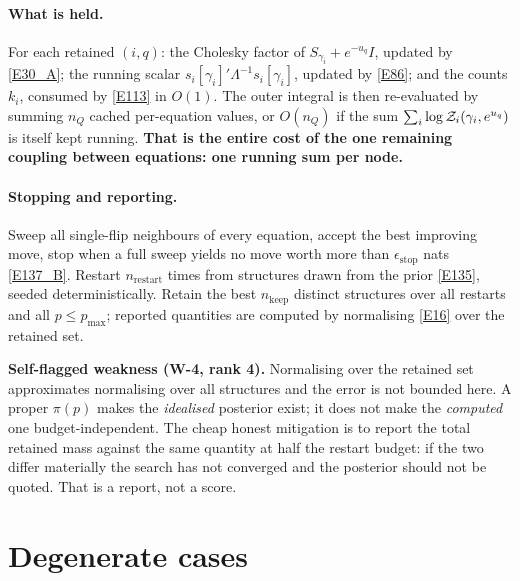 \paragraph{What is held.} For each retained $(i,q)$: the Cholesky factor of
$S_{\gamma_i}+e^{-u_q}I$, updated by \eqref{E30_A}; the running scalar
$s_i[\gamma_i]'\Lambda^{-1}s_i[\gamma_i]$, updated by \eqref{E86}; and the counts
$k_i$, consumed by \eqref{E113} in $O(1)$. The outer integral is then re-evaluated by
summing $n_Q$ cached per-equation values, or $O(n_Q)$ if the sum
$\sum_i\log\mathcal{Z}_i(\gamma_i,e^{u_q})$ is itself kept running. \textbf{That is the
entire cost of the one remaining coupling between equations: one running sum per
node.}

\paragraph{Stopping and reporting.} Sweep all single-flip neighbours of every
equation, accept the best improving move, stop when a full sweep yields no move worth
more than $\epsilon_{\text{stop}}$ nats \eqref{E137_B}. Restart $n_{\text{restart}}$
times from structures drawn from the prior \eqref{E135}, seeded deterministically.
Retain the best $n_{\text{keep}}$ distinct structures over all restarts and all
$p\le p_{\max}$; reported quantities are computed by normalising \eqref{E16} over the
retained set.

\begin{recordbox}
\textbf{Self-flagged weakness (W-4, rank 4).} Normalising over the retained set
approximates normalising over all structures and the error is not bounded here. A
proper $\pi(p)$ makes the \emph{idealised} posterior exist; it does not make the
\emph{computed} one budget-independent. The cheap honest mitigation is to report the
total retained mass against the same quantity at half the restart budget: if the two
differ materially the search has not converged and the posterior should not be
quoted. That is a report, not a score.
\end{recordbox}


\section{Degenerate cases}\label{sec:degen}

